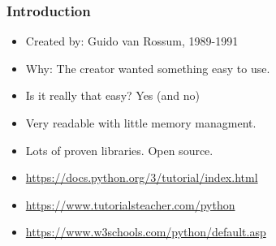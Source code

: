 

\begin{frame}
\frametitle{Introduction}

\begin{itemize}
\item Created by: Guido van Rossum, 1989-1991
\item Why: The creator wanted something easy to use.
\item Is it really that easy? Yes (and no)
\item Very readable with little memory managment.
\item Lots of proven libraries. Open source.
\item \url{https://docs.python.org/3/tutorial/index.html}
\item \url{https://www.tutorialsteacher.com/python}
\item \url{https://www.w3schools.com/python/default.asp}
\end{itemize}

\end{frame}
